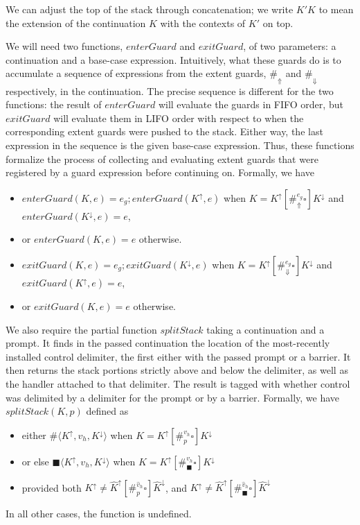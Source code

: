 \documentclass[11pt]{article}
\newcommand{\angles}[1]{\langle#1\rangle}
\begin{document}
We can adjust the top of the stack through concatenation; we write $K'K$ to mean the extension of the continuation $K$ with the contexts of $K'$ on top.

We will need two functions, $enterGuard$ and $exitGuard$, of two parameters: a continuation and a base-case expression.
Intuitively, what these guards do is to accumulate a sequence of expressions from the extent guards, $\#_\Uparrow$ and $\#_\Downarrow$ respectively, in the continuation.
The precise sequence is different for the two functions: the result of $enterGuard$ will evaluate the guards in FIFO order, but $exitGuard$ will evaluate them in LIFO order with respect to when the corresponding extent guards were pushed to the stack.
Either way, the last expression in the sequence is the given base-case expression.
Thus, these functions formalize the process of collecting and evaluating extent guards that were registered by a guard expression before continuing on.
Formally, we have
\begin{itemize}
\item $enterGuard(K, e) = e_g;enterGuard(K^\uparrow, e)$ when $K = K^\uparrow[\#_\Uparrow^{e_g}\square]K^\downarrow$ and $enterGuard(K^\downarrow, e) = e$,
\item or $enterGuard(K, e) = e$ otherwise.
\item $exitGuard(K, e) = e_g;exitGuard(K^\downarrow, e)$ when $K = K^\uparrow[\#_\Downarrow^{e_g}\square]K^\downarrow$ and $exitGuard(K^\uparrow, e) = e$,
\item or $exitGuard(K, e) = e$ otherwise.
\end{itemize}


We also require the partial function $splitStack$ taking a continuation and a prompt.
It finds in the passed continuation the location of the most-recently installed control delimiter, the first either with the passed prompt or a barrier.
It then returns the stack portions strictly above and below the delimiter, as well as the handler attached to that delimiter.
The result is tagged with whether control was delimited by a delimiter for the prompt or by a barrier.
Formally, we have $splitStack(K, p)$ defined as
\begin{itemize}
\item either $\#\angles{K^\uparrow, v_h, K^\downarrow}$
      when $K = K^\uparrow[\#_p^{v_h}\square]K^\downarrow$
\item or else $\blacksquare\angles{K^\uparrow, v_h, K^\downarrow}$
      when $K = K^\uparrow[\#_\blacksquare^{v_h}\square]K^\downarrow$
\item provided both $K^\uparrow \neq \hat{K}^\uparrow[\#_p^{\hat{v}_h}\square]\hat{K}^\downarrow$, and $K^\uparrow \neq \hat{K}^\uparrow[\#_\blacksquare^{\hat{v}_h}\square]\hat{K}^\downarrow$
\end{itemize}
In all other cases, the function is undefined.
\end{document}
